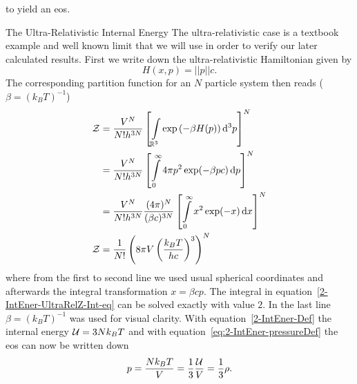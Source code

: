 to yield an \ac{eos}.
%
%
%
\begin{subsection}{The Ultra-Relativistic Internal Energy}
The ultra-relativistic case is a textbook example and well known limit that we will use in order to verify our later calculated results. 
First we write down the ultra-relativistic Hamiltonian given by 
\begin{equation}
	H(x,p)=||p||c.
	\label{eq:2-IntEner-Ultra-Rel-Hamiltonian}
\end{equation}
The corresponding partition function for an $N$ particle system then reads ($\beta=(k_B T)^{-1}$)
\begin{align}
	\mathcal{Z} 	&= \frac{V^N}{N!h^{3N}}\left[\int\limits_{\mathbb{R}^3}\exp\left(- \beta H(p)\right)\mathop{}\!\mathrm{d}^3 p\right]^N\\
		&= \frac{V^N}{N!h^{3N}}\left[\int\limits_0^\infty4\pi p^2\exp(-\beta pc) \mathop{}\!\mathrm{d} p\right]^N\\
		&= \frac{V^N}{N!h^{3N}}\frac{(4\pi)^N}{(\beta c)^{3N}}\left[\int\limits_0^\infty x^2\exp(-x) \mathop{}\!\mathrm{d} x\right]^N\label{2-IntEner-UltraRelZ-Int-eq}\\
	\mathcal{Z}	&= \frac{1}{N!}\left(8\pi V\left(\frac{k_B T}{hc}\right)^3\right)^N
	\label{eq:2-IntEner-UltraRelZ}
\end{align}
where from the first to second line we used usual spherical coordinates and afterwards the integral transformation $x=\beta cp$.
The integral in equation~\eqref{2-IntEner-UltraRelZ-Int-eq} can be solved exactly with value $2$.
In the last line $\beta=(k_B T)^{-1}$ was used for visual clarity.
With equation~\eqref{2-IntEner-Def} the internal energy $\mathcal{U} = 3Nk_B T$ and with equation~\eqref{eq:2-IntEner-pressureDef} the \ac{eos} can now be written down
\begin{equation}
	p = \frac{Nk_B T}{V} = \frac{1}{3}\frac{\mathcal{U}}{V} = \frac{1}{3}\rho.
	\label{eq:2-IntEner-eos-nonrel}
\end{equation}
\end{subsection}
%
%
%
